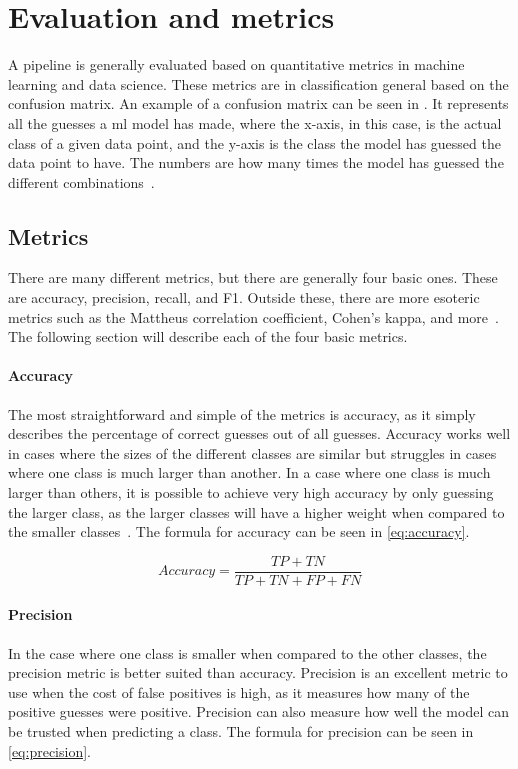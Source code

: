 \section{Evaluation and metrics}\label{sec:evalueation}
A pipeline is generally evaluated based on quantitative metrics in machine learning and data science. These metrics are in classification general based on the confusion matrix. An example of a confusion matrix can be seen in . It represents all the guesses a \gls{ml} model has made, where the x-axis, in this case, is the actual class of a given data point, and the y-axis is the class the model has guessed the data point to have. The numbers are how many times the model has guessed the different combinations~\cite{james-statistical-learning}. 

\subsection{Metrics}\label{subsec:metrics}
There are many different metrics, but there are generally four basic ones. These are accuracy, precision, recall, and F1. Outside these, there are more esoteric metrics such as the Mattheus correlation coefficient, Cohen's kappa, and more~\cite{metrics-for-multi}. The following section will describe each of the four basic metrics. 

\paragraph{Accuracy} The most straightforward and simple of the metrics is accuracy, as it simply describes the percentage of correct guesses out of all guesses. Accuracy works well in cases where the sizes of the different classes are similar but struggles in cases where one class is much larger than another. In a case where one class is much larger than others, it is possible to achieve very high accuracy by only guessing the larger class, as the larger classes will have a higher weight when compared to the smaller classes~\cite{metrics-for-multi}. The formula for accuracy can be seen in \ref{eq:accuracy}.

\begin{equation}
    Accuracy = \frac{TP + TN}{TP + TN + FP + FN}
\end{equation}\label{eq:accuracy}

\paragraph{Precision} In the case where one class is smaller when compared to the other classes, the precision metric is better suited than accuracy. Precision is an excellent metric to use when the cost of false positives is high, as it measures how many of the positive guesses were positive. Precision can also measure how well the model can be trusted when predicting a class\cite{metrics-for-multi}. The formula for precision can be seen in \ref{eq:precision}.

